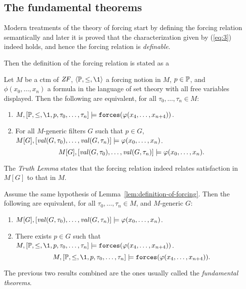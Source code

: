 \subsection{The fundamental theorems}
\label{sec:fundamental-theorems}
Modern treatments of the theory of forcing start
by defining the 
forcing relation semantically and later it is proved  that the
characterization given by (\ref{eq:3}) indeed holds, and hence the
forcing relation is \emph{definable}.

Then the definition of the forcing relation is stated as a
\begin{lemma}\label{lem:definition-of-forcing}
  Let $M$ be a ctm of $\mathit{ZF}$, $\lb\PP,\leq,\1\rb$ a forcing notion
  in $M$, $p\in\mathbb{P}$, and $\phi(x_0,\dots,x_n)$ a formula in the
  language of set 
  theory with all free variables displayed. Then the
  following are equivalent, for all $\tau_0,\dots,\tau_n\in M$:
  \begin{enumerate}
  \item $M,[\PP,\leq,\1,p,\tau_0,\dots,\tau_n] 
  \models\forceisa(\phi(x_4,\dots,x_{n+4}))$.
  \item For all $M$-generic filters $G$ such that $p\in G$,
    \ifIEEE
    $M[G],[\operatorname{\mathit{val}}(G,\tau_0),\dots,\operatorname{\mathit{val}}(G,\tau_n)]
    \models\varphi(x_0,\dots,x_n)$.
    \fi
    \ifarXiv
    \[
    M[G],[\operatorname{\mathit{val}}(G,\tau_0),\dots,\operatorname{\mathit{val}}(G,\tau_n)]
    \models\varphi(x_0,\dots,x_n).
    \]
    \fi
  \end{enumerate}
\end{lemma}

The \emph{Truth Lemma} states that the forcing
relation indeed relates 
satisfaction in $M[G]$ to that in $M$. 
\begin{lemma}\label{lem:truth-lemma}
  Assume the same hypothesis of
  Lemma~\ref{lem:definition-of-forcing}. Then the
  following are equivalent, for all $\tau_0,\dots,\tau_n\in M$, and
  $M$-generic $G$: 
  \begin{enumerate}
  \item $M[G],[\operatorname{\mathit{val}}(G,\tau_0),\dots,\operatorname{\mathit{val}}(G,\tau_n)]
  \models\varphi(x_0,\dots,x_n)$.
  \item  There exists $p\in G$ such that 
    \ifIEEE 
    $M,[\PP,\leq,\1,p,\tau_0,\dots,\tau_n] 
    \models\forceisa(\phi(x_4,\dots,x_{n+4}))$.
    \fi
    \ifarXiv 
    \[ 
    M,[\PP,\leq,\1,p,\tau_0,\dots,\tau_n] 
    \models\forceisa(\phi(x_4,\dots,x_{n+4})).
    \]
    \fi
  \end{enumerate}
\end{lemma}
\noindent The previous two results combined are the ones usually called the
\emph{fundamental theorems}. 

